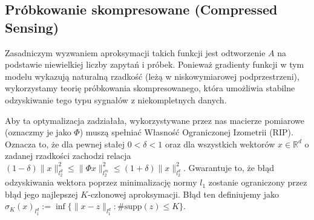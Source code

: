 \subsection{Próbkowanie skompresowane (Compressed Sensing)}


Zasadniczym wyzwaniem aproksymacji takich funkcji jest odtworzenie $A$ na podstawie niewielkiej liczby zapytań i próbek. Ponieważ gradienty funkcji w tym modelu wykazują naturalną rzadkość (leżą w niskowymiarowej podprzestrzeni), wykorzystamy teorię próbkowania skompresowanego, która umożliwia stabilne odzyskiwanie tego typu sygnałów z niekompletnych danych.

Aby ta optymalizacja zadziałała, wykorzystywane przez nas macierze pomiarowe (oznaczmy je jako $\Phi$) muszą spełniać Własność Ograniczonej Izometrii (RIP). Oznacza to, że dla pewnej stałej $0<\delta<1$ oraz dla wszystkich wektorów $x \in \mathbb{R}^d$ o zadanej rzadkości zachodzi relacja $(1-\delta)\|x\|_{l_2^d}^2 \le \|\Phi x\|_{l_2^m}^2 \le (1+\delta)\|x\|_{l_2^d}^2$. Gwarantuje to, że błąd odzyskiwania wektora poprzez minimalizację normy $l_1$  zostanie ograniczony przez błąd jego najlepszej $K$-członowej aproksymacji. Błąd ten definiujemy jako $\sigma_K(x)_{l_1^d} := \inf \{ \|x - z\|_{l_1^d} : \#\text{supp}(z) \le K \}$.